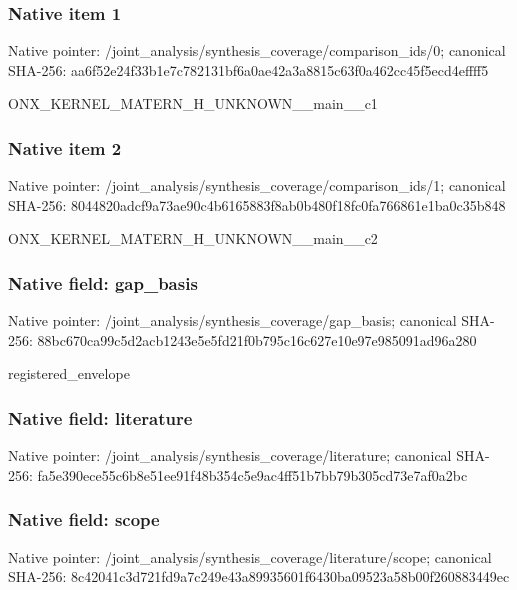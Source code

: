 \documentclass[10pt,a4paper]{article}
\begin{document}
\subsubsection{Native item 1}
Native pointer: /joint\_\allowbreak{}analysis/synthesis\_\allowbreak{}coverage/comparison\_\allowbreak{}ids/0; canonical SHA-256: aa6f52e24f33b1e7c782131bf6a0ae42a3a8815c63f0a462cc45f5ecd4effff5

\begingroup\raggedright\sloppy ONX\_\allowbreak{}KERNEL\_\allowbreak{}MATERN\_\allowbreak{}H\_\allowbreak{}UNKNOWN\_\allowbreak{}\_\allowbreak{}main\_\allowbreak{}\_\allowbreak{}c1\par\endgroup

\subsubsection{Native item 2}
Native pointer: /joint\_\allowbreak{}analysis/synthesis\_\allowbreak{}coverage/comparison\_\allowbreak{}ids/1; canonical SHA-256: 8044820adcf9a73ae90c4b6165883f8ab0b480f18fc0fa766861e1ba0c35b848

\begingroup\raggedright\sloppy ONX\_\allowbreak{}KERNEL\_\allowbreak{}MATERN\_\allowbreak{}H\_\allowbreak{}UNKNOWN\_\allowbreak{}\_\allowbreak{}main\_\allowbreak{}\_\allowbreak{}c2\par\endgroup

\subsubsection{Native field: gap\_\allowbreak{}basis}
Native pointer: /joint\_\allowbreak{}analysis/synthesis\_\allowbreak{}coverage/gap\_\allowbreak{}basis; canonical SHA-256: 88bc670ca99c5d2acb1243e5e5fd21f0b795c16c627e10e97e985091ad96a280

\begingroup\raggedright\sloppy registered\_\allowbreak{}envelope\par\endgroup

\subsubsection{Native field: literature}
Native pointer: /joint\_\allowbreak{}analysis/synthesis\_\allowbreak{}coverage/literature; canonical SHA-256: fa5e390ece55c6b8e51ee91f48b354c5e9ac4ff51b7bb79b305cd73e7af0a2bc

\subsubsection{Native field: scope}
Native pointer: /joint\_\allowbreak{}analysis/synthesis\_\allowbreak{}coverage/literature/scope; canonical SHA-256: 8c42041c3d721fd9a7c249e43a89935601f6430ba09523a58b00f260883449ec
\end{document}

